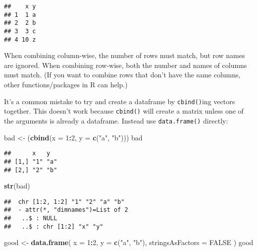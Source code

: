 \documentclass[
]{book}
\newenvironment{Shaded}{\begin{snugshade}}{\end{snugshade}}
\newcommand{\DataTypeTok}[1]{\textcolor[rgb]{0.13,0.29,0.53}{#1}}
\newcommand{\DecValTok}[1]{\textcolor[rgb]{0.00,0.00,0.81}{#1}}
\newcommand{\KeywordTok}[1]{\textcolor[rgb]{0.13,0.29,0.53}{\textbf{#1}}}
\newcommand{\NormalTok}[1]{#1}
\newcommand{\OperatorTok}[1]{\textcolor[rgb]{0.81,0.36,0.00}{\textbf{#1}}}
\newcommand{\OtherTok}[1]{\textcolor[rgb]{0.56,0.35,0.01}{#1}}
\newcommand{\StringTok}[1]{\textcolor[rgb]{0.31,0.60,0.02}{#1}}
\begin{document}
\begin{verbatim}
##    x y
## 1  1 a
## 2  2 b
## 3  3 c
## 4 10 z
\end{verbatim}

When combining column-wise, the number of rows must match, but row names are ignored. When combining row-wise, both the number and names of columns must match. (If you want to combine rows that don't have the same columns, other functions/packages in R can help.)

It's a common mistake to try and create a dataframe by \texttt{cbind()}ing vectors together. This doesn't work because \texttt{cbind()} will create a matrix unless one of the arguments is already a dataframe. Instead use \texttt{data.frame()} directly:

\begin{Shaded}
\begin{Highlighting}[]
\NormalTok{bad \textless{}{-}}\StringTok{ }\NormalTok{(}\KeywordTok{cbind}\NormalTok{(}\DataTypeTok{x =} \DecValTok{1}\OperatorTok{:}\DecValTok{2}\NormalTok{, }\DataTypeTok{y =} \KeywordTok{c}\NormalTok{(}\StringTok{"a"}\NormalTok{, }\StringTok{"b"}\NormalTok{)))}
\NormalTok{bad}
\end{Highlighting}
\end{Shaded}

\begin{verbatim}
##      x   y  
## [1,] "1" "a"
## [2,] "2" "b"
\end{verbatim}

\begin{Shaded}
\begin{Highlighting}[]
\KeywordTok{str}\NormalTok{(bad)}
\end{Highlighting}
\end{Shaded}

\begin{verbatim}
##  chr [1:2, 1:2] "1" "2" "a" "b"
##  - attr(*, "dimnames")=List of 2
##   ..$ : NULL
##   ..$ : chr [1:2] "x" "y"
\end{verbatim}

\begin{Shaded}
\begin{Highlighting}[]
\NormalTok{good \textless{}{-}}\StringTok{ }\KeywordTok{data.frame}\NormalTok{(}
  \DataTypeTok{x =} \DecValTok{1}\OperatorTok{:}\DecValTok{2}\NormalTok{, }\DataTypeTok{y =} \KeywordTok{c}\NormalTok{(}\StringTok{"a"}\NormalTok{, }\StringTok{"b"}\NormalTok{),}
  \DataTypeTok{stringsAsFactors =} \OtherTok{FALSE}
\NormalTok{)}
\NormalTok{good}
\end{Highlighting}
\end{Shaded}
\end{document}
